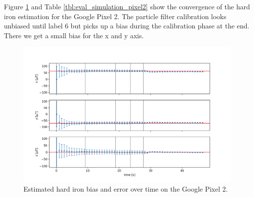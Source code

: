 \begin{table}[H]
    \centering
    \caption{Estimated hard iron bias in $\mu T$ with different methods on the Google Pixel 3.}
    \label{tbl:eval_simulation_pixel3}
\end{table}

Figure \ref{fig:eval_simulation_pixel2} and Table \ref{tbl:eval_simulation_pixel2} show the convergence of the hard iron estimation for the Google Pixel 2. The particle filter calibration looks unbiased until label 6 but picks up a bias during the calibration phase at the end. There we get a small bias for the x and y axis.

\begin{figure}[H]
    \centering
    \includegraphics[width=1.0\textwidth]{figures/convergence_pixel2.png}
    \caption{Estimated hard iron bias and error over time on the Google Pixel 2.}
    \label{fig:eval_simulation_pixel2}
\end{figure}


